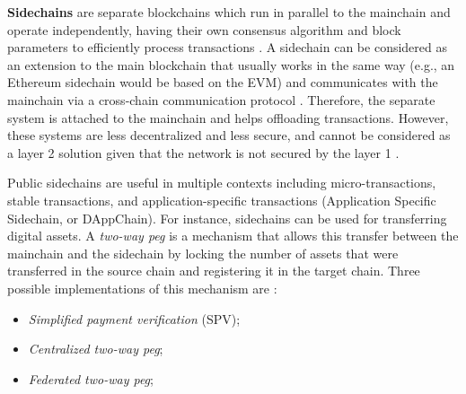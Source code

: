 \documentclass[runningheads]{llncs}
\begin{document}
\textbf{Sidechains} are separate blockchains which run in parallel to the mainchain and operate independently, having their own consensus algorithm and block parameters to efficiently process transactions \cite{eth_sidechains}. A sidechain can be considered as an extension to the main blockchain \cite{abrunhosa_2021} that usually works in the same way (e.g., an Ethereum sidechain would be based on the EVM) and communicates with the mainchain via a cross-chain communication protocol \cite{survey}. Therefore, the separate system is attached to the mainchain and helps offloading transactions. However, these systems are less decentralized and less secure, and cannot be considered as a layer 2 solution given that the network is not secured by the layer 1 \cite{eth_sidechains}.

Public sidechains are useful in multiple contexts including micro-transactions, stable transactions, and application-specific transactions (Application Specific Sidechain, or DAppChain). For instance, sidechains can be used for transferring digital assets. A \textit{two-way peg} is a mechanism that allows this transfer between the mainchain and the sidechain by locking the number of assets that were transferred in the source chain and registering it in the target chain. Three possible implementations of this mechanism are \cite{survey}: %
\begin{itemize}
    \item \textit{Simplified payment verification} (SPV);
    \item \textit{Centralized two-way peg};
    \item \textit{Federated two-way peg};
\end{itemize}

\end{document}
